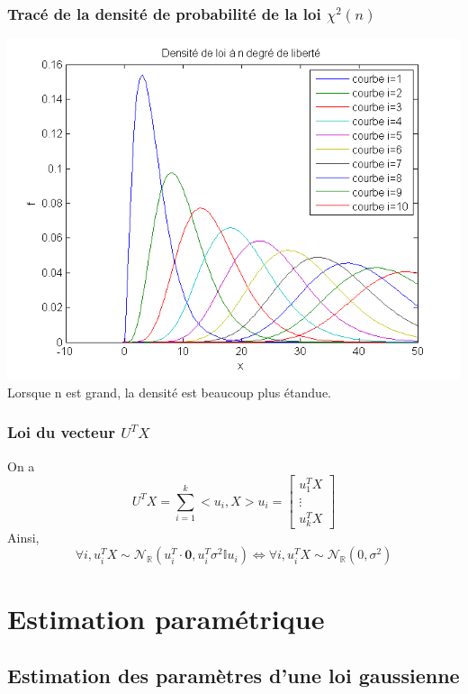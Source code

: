\documentclass{report}
\begin{document}
		\subsection{Tracé de la densité de probabilité de la loi $\chi^2(n)$}
			\includegraphics[scale=0.7]{sources/Q252.png} \\
			Lorsque n est grand, la densité est beaucoup plus étandue.
		\subsection{Loi du vecteur $U^TX$}
			On a
			\[ U^TX = \sum\limits_{i=1}^k <u_i, X>u_i = 
			\left[
				\begin{array}{c}
					u_1^TX \\
					\vdots \\
					u_k^TX
				\end{array}
			\right] \]
			Ainsi,
			\[ \forall i, u_i^TX \sim \mathcal{N}_\mathbb{R}(u_i^T \cdot \textbf{0}, u_i^T \sigma^2 \mathbb{I} u_i) \Leftrightarrow \forall i, u_i^TX \sim \mathcal{N}_\mathbb{R}(0, \sigma^2) \]

\chapter{Estimation paramétrique}
	\section{Estimation des paramètres d'une loi gaussienne}
\end{document}
